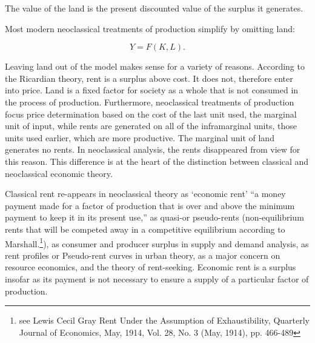 The value of the land is the present discounted value of the surplus it generates.

Most modern neoclassical treatments of production simplify by omitting land: 

\begin{equation} 
Y=F(K,L).
\label{Eqn:Prod1}
\end{equation} 

Leaving land out of the model makes sense for a variety of reasons. According to the Ricardian theory, rent is a surplus above cost. It does not, therefore enter into price. Land is a fixed factor for society as a whole that is not consumed in  the process of production.  Furthermore, neoclassical treatments of production focus price determination based on the cost of the last unit used, the marginal  unit of input, while rents are generated on all of the inframarginal units, those units used earlier, which are more productive. The marginal unit of land generates no rents. In neoclassical analysis, the rents disappeared from view for this reason. This difference is at the heart of the distinction between classical and neoclassical economic theory. 

Classical rent re-appears in neoclassical theory as `economic rent' ``a money payment made for a factor of production that is over and above the minimum payment to keep it in its present use,''  as quasi-or pseudo-rents (non-equilibrium rents that will be competed away in a competitive equilibrium according to Marshall.\footnote{see Lewis Cecil Gray Rent Under the Assumption of Exhaustibility, Quarterly Journal of Economics, May, 1914, Vol. 28, No. 3 (May, 1914), pp. 466-489}),  as consumer  and producer surplus in supply and demand analysis,  as rent profiles or Pseudo-rent curves in urban theory, as a major concern on resource economics, and the theory of rent-seeking. Economic rent is a surplus insofar as its payment is not necessary to ensure a supply of a particular factor of production. 




